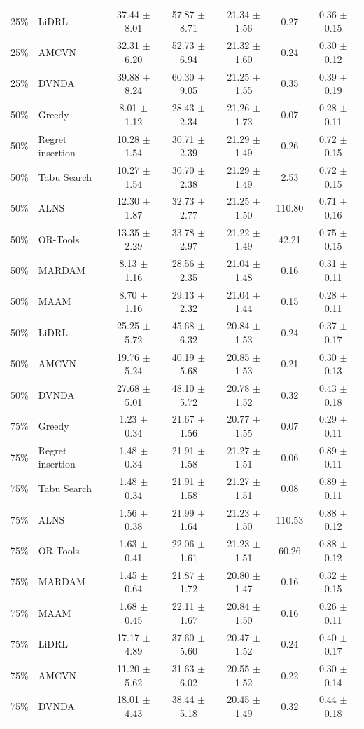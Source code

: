 \begin{tabular}{clccccc}
25\% & LiDRL & 37.44 $\pm$ 8.01 & 57.87 $\pm$ 8.71 & 21.34 $\pm$ 1.56 & 0.27 & 0.36 $\pm$ 0.15 \\
25\% & AMCVN & 32.31 $\pm$ 6.20 & 52.73 $\pm$ 6.94 & 21.32 $\pm$ 1.60 & 0.24 & 0.30 $\pm$ 0.12 \\
25\% & DVNDA & 39.88 $\pm$ 8.24 & 60.30 $\pm$ 9.05 & 21.25 $\pm$ 1.55 & 0.35 & 0.39 $\pm$ 0.19 \\
50\% & Greedy & 8.01 $\pm$ 1.12 & 28.43 $\pm$ 2.34 & 21.26 $\pm$ 1.73 & 0.07 & 0.28 $\pm$ 0.11 \\
50\% & Regret insertion & 10.28 $\pm$ 1.54 & 30.71 $\pm$ 2.39 & 21.29 $\pm$ 1.49 & 0.26 & 0.72 $\pm$ 0.15 \\
50\% & Tabu Search & 10.27 $\pm$ 1.54 & 30.70 $\pm$ 2.38 & 21.29 $\pm$ 1.49 & 2.53 & 0.72 $\pm$ 0.15 \\
50\% & ALNS & 12.30 $\pm$ 1.87 & 32.73 $\pm$ 2.77 & 21.25 $\pm$ 1.50 & 110.80 & 0.71 $\pm$ 0.16 \\
50\% & OR-Tools & 13.35 $\pm$ 2.29 & 33.78 $\pm$ 2.97 & 21.22 $\pm$ 1.49 & 42.21 & 0.75 $\pm$ 0.15 \\
50\% & MARDAM & 8.13 $\pm$ 1.16 & 28.56 $\pm$ 2.35 & 21.04 $\pm$ 1.48 & 0.16 & 0.31 $\pm$ 0.11 \\
50\% & MAAM & 8.70 $\pm$ 1.16 & 29.13 $\pm$ 2.32 & 21.04 $\pm$ 1.44 & 0.15 & 0.28 $\pm$ 0.11 \\
50\% & LiDRL & 25.25 $\pm$ 5.72 & 45.68 $\pm$ 6.32 & 20.84 $\pm$ 1.53 & 0.24 & 0.37 $\pm$ 0.17 \\
50\% & AMCVN & 19.76 $\pm$ 5.24 & 40.19 $\pm$ 5.68 & 20.85 $\pm$ 1.53 & 0.21 & 0.30 $\pm$ 0.13 \\
50\% & DVNDA & 27.68 $\pm$ 5.01 & 48.10 $\pm$ 5.72 & 20.78 $\pm$ 1.52 & 0.32 & 0.43 $\pm$ 0.18 \\
75\% & Greedy & 1.23 $\pm$ 0.34 & 21.67 $\pm$ 1.56 & 20.77 $\pm$ 1.55 & 0.07 & 0.29 $\pm$ 0.11 \\
75\% & Regret insertion & 1.48 $\pm$ 0.34 & 21.91 $\pm$ 1.58 & 21.27 $\pm$ 1.51 & 0.06 & 0.89 $\pm$ 0.11 \\
75\% & Tabu Search & 1.48 $\pm$ 0.34 & 21.91 $\pm$ 1.58 & 21.27 $\pm$ 1.51 & 0.08 & 0.89 $\pm$ 0.11 \\
75\% & ALNS & 1.56 $\pm$ 0.38 & 21.99 $\pm$ 1.64 & 21.23 $\pm$ 1.50 & 110.53 & 0.88 $\pm$ 0.12 \\
75\% & OR-Tools & 1.63 $\pm$ 0.41 & 22.06 $\pm$ 1.61 & 21.23 $\pm$ 1.51 & 60.26 & 0.88 $\pm$ 0.12 \\
75\% & MARDAM & 1.45 $\pm$ 0.64 & 21.87 $\pm$ 1.72 & 20.80 $\pm$ 1.47 & 0.16 & 0.32 $\pm$ 0.15 \\
75\% & MAAM & 1.68 $\pm$ 0.45 & 22.11 $\pm$ 1.67 & 20.84 $\pm$ 1.50 & 0.16 & 0.26 $\pm$ 0.11 \\
75\% & LiDRL & 17.17 $\pm$ 4.89 & 37.60 $\pm$ 5.60 & 20.47 $\pm$ 1.52 & 0.24 & 0.40 $\pm$ 0.17 \\
75\% & AMCVN & 11.20 $\pm$ 5.62 & 31.63 $\pm$ 6.02 & 20.55 $\pm$ 1.52 & 0.22 & 0.30 $\pm$ 0.14 \\
75\% & DVNDA & 18.01 $\pm$ 4.43 & 38.44 $\pm$ 5.18 & 20.45 $\pm$ 1.49 & 0.32 & 0.44 $\pm$ 0.18 \\
\bottomrule
\end{tabular}
